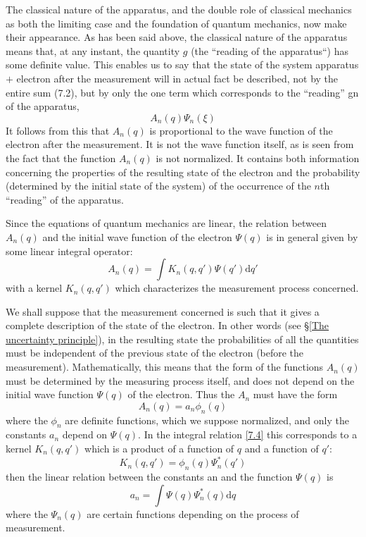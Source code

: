 The classical nature of the apparatus, and the double role of classical mechanics as both the limiting case and the foundation of quantum mechanics, now make their appearance. As has been said above, the classical nature of the apparatus means that, at any instant, the quantity $ g $ (the “reading of the apparatus“) has some definite value. This enables us to say that the state of the system apparatus $ + $ electron after the measurement will in actual fact be described, not by the entire sum (7.2), but by only the one term which corresponds to the “reading” gn of the apparatus,
\begin{equation}\label{7.3}
A_n(q)\Psi_n(\xi)
\end{equation}	
It follows from this that $ A_n(q) $ is proportional to the wave function of the electron after the measurement. It is not the wave function itself, as is seen from the fact that the function $ A_n(q) $ is not normalized. It contains both information concerning the properties of the resulting state of the electron and the probability (determined by the initial state of the system) of the occurrence of the $ n $th “reading” of the apparatus.
	
Since the equations of quantum mechanics are linear, the relation between $ A_n(q) $ and the initial wave function of the electron $ \Psi(q) $ is in general given by some linear integral operator:
\begin{equation}\label{7.4}
A_n(q)=\int K_n(q,q')\Psi(q')\mathrm{d}q'
\end{equation}	
with a kernel $ K_n(q, q') $ which characterizes the measurement process concerned.
		
We shall suppose that the measurement concerned is such that it gives a complete description of the state of the electron. In other words (see §\ref{The uncertainty principle}), in the resulting state the probabilities of all the quantities must be independent of the previous state of the electron (before the measurement). Mathematically, this means that the form of the functions $ A_n(q) $ must be determined by the measuring process itself, and does not depend on the initial wave function $ \Psi(q) $ of the electron. Thus the $ A_n $ must have the form
\begin{equation}\label{7.5}
A_n(q)=a_n\phi_n(q)
\end{equation}		
where the $\phi_n$ are definite functions, which we suppose normalized, and only the constants $ a_n $ depend on $ \Psi(q) $. In the integral relation \eqref{7.4} this corresponds to a kernel $ K_n(q, q') $ which is a product of a function of $ q $ and a function of $ q' $:
\begin{equation}\label{7.6}
K_n(q,q')=\phi_n(q)\Psi_n^*(q')
\end{equation}		
then the linear relation between the constants an and the function $ \Psi(q) $ is
\begin{equation}\label{7.7}
a_n=\int\Psi(q)\Psi_n^*(q)\mathrm{d}q
\end{equation}		
where the $ \Psi_n(q) $ are certain functions depending on the process of measurement.
		
